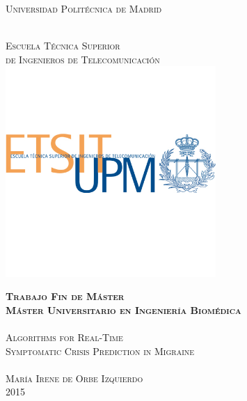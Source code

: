


\begin{titlepage}
\setlength{\headheight}{0pt}
\setlength{\footskip}{0pt}
\setlength{\topmargin}{0pt}

\begin{adjustwidth}{-1cm}{-3cm}
\begin{center}
\LARGE
\textsc{Universidad Politécnica de Madrid}

	\smallskip

    \hfill
	\\
	\textsc{Escuela Técnica Superior\\ de Ingenieros de Telecomunicación}\\ 


        \includegraphics[width=8cm]{images/etsit}


	\textsc{\textbf{Trabajo Fin de Máster}}\\

    \smallskip
    \textsc{\textbf{Máster Universitario en Ingeniería Biomédica}}\\
	
    \bigskip
	\hfill
    \\
    
    \textsc{Algorithms for Real-Time \\ Symptomatic Crisis Prediction in Migraine} \\ %

	\bigskip
    \hfill
    \\

	\textsc{María Irene de Orbe Izquierdo}
	\vspace{0.5cm}
    \hfill
    \\
	\textsc{2015}
        



\end{center}
\end{adjustwidth}
\end{titlepage}
